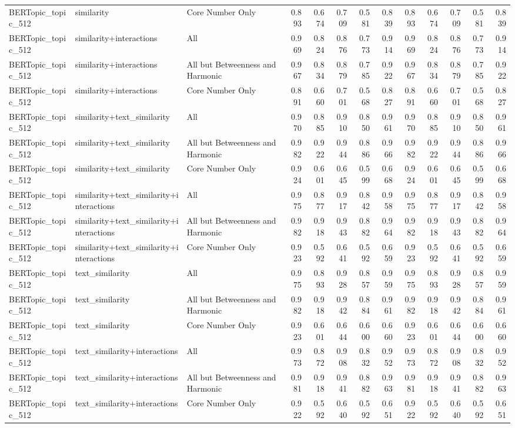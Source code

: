 \begin{tabular}{lllrrrrrrrrrr}
BERTopic\_topic\_512 & similarity & Core Number Only & 0.893 & 0.674 & 0.709 & 0.581 & 0.839 & 0.893 & 0.674 & 0.709 & 0.581 & 0.839 \\
BERTopic\_topic\_512 & similarity+interactions & All & 0.969 & 0.824 & 0.876 & 0.773 & 0.914 & 0.969 & 0.824 & 0.876 & 0.773 & 0.914 \\
BERTopic\_topic\_512 & similarity+interactions & All but Betweenness and Harmonic & 0.967 & 0.834 & 0.879 & 0.785 & 0.922 & 0.967 & 0.834 & 0.879 & 0.785 & 0.922 \\
BERTopic\_topic\_512 & similarity+interactions & Core Number Only & 0.891 & 0.660 & 0.701 & 0.568 & 0.827 & 0.891 & 0.660 & 0.701 & 0.568 & 0.827 \\
BERTopic\_topic\_512 & similarity+text\_similarity & All & 0.970 & 0.885 & 0.910 & 0.850 & 0.961 & 0.970 & 0.885 & 0.910 & 0.850 & 0.961 \\
BERTopic\_topic\_512 & similarity+text\_similarity & All but Betweenness and Harmonic & 0.982 & 0.922 & 0.944 & 0.886 & 0.966 & 0.982 & 0.922 & 0.944 & 0.886 & 0.966 \\
BERTopic\_topic\_512 & similarity+text\_similarity & Core Number Only & 0.924 & 0.601 & 0.645 & 0.599 & 0.668 & 0.924 & 0.601 & 0.645 & 0.599 & 0.668 \\
BERTopic\_topic\_512 & similarity+text\_similarity+interactions & All & 0.975 & 0.877 & 0.917 & 0.842 & 0.958 & 0.975 & 0.877 & 0.917 & 0.842 & 0.958 \\
BERTopic\_topic\_512 & similarity+text\_similarity+interactions & All but Betweenness and Harmonic & 0.982 & 0.918 & 0.943 & 0.882 & 0.964 & 0.982 & 0.918 & 0.943 & 0.882 & 0.964 \\
BERTopic\_topic\_512 & similarity+text\_similarity+interactions & Core Number Only & 0.923 & 0.592 & 0.641 & 0.592 & 0.659 & 0.923 & 0.592 & 0.641 & 0.592 & 0.659 \\
BERTopic\_topic\_512 & text\_similarity & All & 0.975 & 0.893 & 0.928 & 0.857 & 0.959 & 0.975 & 0.893 & 0.928 & 0.857 & 0.959 \\
BERTopic\_topic\_512 & text\_similarity & All but Betweenness and Harmonic & 0.982 & 0.918 & 0.942 & 0.884 & 0.961 & 0.982 & 0.918 & 0.942 & 0.884 & 0.961 \\
BERTopic\_topic\_512 & text\_similarity & Core Number Only & 0.923 & 0.601 & 0.644 & 0.600 & 0.660 & 0.923 & 0.601 & 0.644 & 0.600 & 0.660 \\
BERTopic\_topic\_512 & text\_similarity+interactions & All & 0.973 & 0.872 & 0.908 & 0.832 & 0.952 & 0.973 & 0.872 & 0.908 & 0.832 & 0.952 \\
BERTopic\_topic\_512 & text\_similarity+interactions & All but Betweenness and Harmonic & 0.981 & 0.918 & 0.941 & 0.882 & 0.963 & 0.981 & 0.918 & 0.941 & 0.882 & 0.963 \\
BERTopic\_topic\_512 & text\_similarity+interactions & Core Number Only & 0.922 & 0.592 & 0.640 & 0.592 & 0.651 & 0.922 & 0.592 & 0.640 & 0.592 & 0.651 \\
\bottomrule
\end{tabular}
